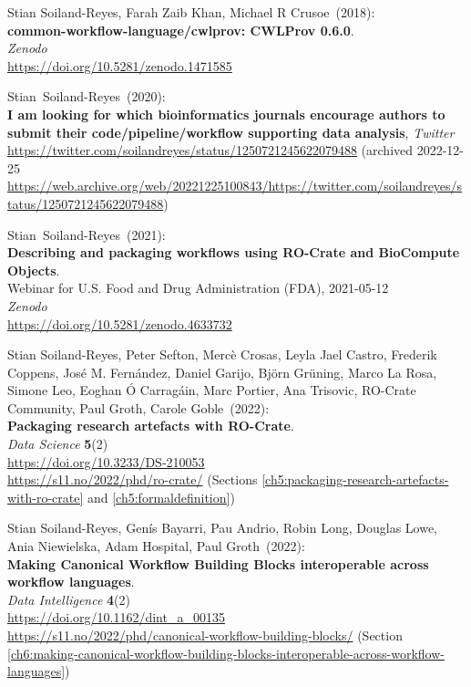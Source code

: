 \begin{thebibliography}{9}
Stian Soiland-Reyes, Farah Zaib Khan, Michael R Crusoe~(2018): \\
\textbf{common-workflow-language/cwlprov: CWLProv 0.6.0}.\\
\emph{Zenodo}\\
\url{https://doi.org/10.5281/zenodo.1471585}

Stian~Soiland-Reyes~(2020): \\
\textbf{I am looking for which bioinformatics journals encourage authors to submit their code/pipeline/workflow supporting data analysis},
\emph{Twitter}\\
\url{https://twitter.com/soilandreyes/status/1250721245622079488}
(archived 2022-12-25 
\url{https://web.archive.org/web/20221225100843/https://twitter.com/soilandreyes/status/1250721245622079488})

Stian~Soiland-Reyes~(2021): \\
\textbf{Describing and packaging workflows using RO-Crate and BioCompute Objects}.\\
Webinar for U.S. Food and Drug Administration
(FDA), 2021-05-12\\
\emph{Zenodo}\\
\url{https://doi.org/10.5281/zenodo.4633732}

Stian Soiland-Reyes, Peter Sefton, Mercè Crosas, Leyla Jael Castro, Frederik Coppens, José M. Fernández, Daniel Garijo, Björn Grüning, Marco La Rosa, Simone Leo, Eoghan Ó Carragáin, Marc Portier, Ana Trisovic, RO-Crate Community, Paul Groth, Carole Goble~(2022): \\
\textbf{Packaging research artefacts with RO-Crate}.\\
\emph{Data Science} \textbf{5}(2)\\
\url{https://doi.org/10.3233/DS-210053}\\
\url{https://s11.no/2022/phd/ro-crate/}
(Sections \vref{ch5:packaging-research-artefacts-with-ro-crate} and \vref{ch5:formaldefinition})

Stian Soiland-Reyes, Genís Bayarri, Pau Andrio, Robin Long, Douglas Lowe, Ania Niewielska, Adam Hospital, Paul Groth~(2022): \\
\textbf{Making Canonical Workflow Building Blocks interoperable across workflow languages}.\\
\emph{Data Intelligence} \textbf{4}(2)\\
\url{https://doi.org/10.1162/dint_a_00135}\\
\url{https://s11.no/2022/phd/canonical-workflow-building-blocks/}
(Section \vref{ch6:making-canonical-workflow-building-blocks-interoperable-across-workflow-languages})


\end{thebibliography}
